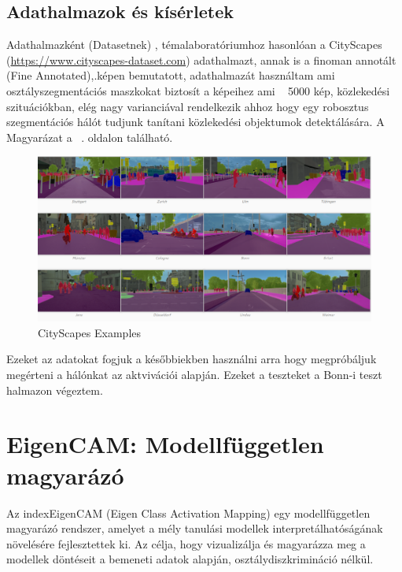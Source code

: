 \documentclass[12pt,oneside,a4paper]{article}
\newcommand{\newsection}[1]{\clearpage\section{#1}}\label{makro}
\theoremstyle{remark}
\begin{document}
\subsection{Adathalmazok és kísérletek}\label{subsec:adathalmazok-es-kiserletek}
\pagestyle{fancy}
    Adathalmazként (Datasetnek) , témalaboratóriumhoz hasonlóan a CityScapes
    (\url{https://www.cityscapes-dataset.com}) adathalmazt, annak is a finoman annotált (Fine Annotated),\label{kephivatkozas}.képen bemutatott,
adathalmazát használtam ami osztályszegmentációs maszkokat biztosít a képeihez ami ~ 5000 kép, közlekedési szituációkban, elég nagy
varianciával rendelkezik ahhoz hogy egy robosztus szegmentációs hálót tudjunk tanítani közlekedési objektumok
detektálására.
A Magyarázat a ~\pageref{subsec:magyarazat}\label{pageref}. oldalon található.


    \begin{figure}[h]
       \centering
        \noindent\includegraphics[width=1\linewidth]{cityscapes}
        \caption{CityScapes Examples}
        \label{fig:CityScapes-Examples}
    \end{figure}
    Ezeket az adatokat fogjuk a későbbiekben használni arra hogy megpróbáljuk megérteni a hálónkat az aktvivációi
    alapján.
    Ezeket a teszteket a Bonn-i teszt halmazon végeztem.

\newsection{EigenCAM: Modellfüggetlen magyarázó}\label{sec:eigencam:-modellfuggetlen-magyarazo}
     Az index{EigenCAM} (Eigen Class Activation Mapping) egy modellfüggetlen magyarázó rendszer, amelyet a mély tanulási
     modellek interpretálhatóságának növelésére fejlesztettek ki.
     Az  célja, hogy vizualizálja és magyarázza meg a modellek döntéseit a bemeneti adatok alapján,
     osztálydiszkrimináció nélkül.
\end{document}
